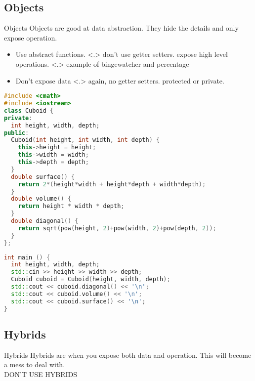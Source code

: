 \documentclass{beamer}
\begin{document}
\subsection{Objects}
\begin{frame}{Objects}
  Objects are good at data abstraction. They hide the details and only expose operation.
  \begin{itemize}[<+->]
    \item Use abstract functions. 
      \note[item]<.>{
        don't use getter setters. expose high level operations.
      }
      \note[item]<.>{
        example of bingewatcher and percentage
      }
    \item Don't expose data
      \note[item]<.>{
        again, no getter setters. protected or private.
      }
  \end{itemize}
\end{frame}
\begin{frame}[fragile]
  \begin{lstlisting}[language=C++]
#include <cmath>
#include <iostream>
class Cuboid {
private:
  int height, width, depth;
public:
  Cuboid(int height, int width, int depth) {
    this->height = height;
    this->width = width;
    this->depth = depth;
  }
  double surface() {
    return 2*(height*width + height*depth + width*depth);
  }
  double volume() {
    return height * width * depth;
  }
  double diagonal() {
    return sqrt(pow(height, 2)+pow(width, 2)+pow(depth, 2));
  }
};\end{lstlisting}
\end{frame}
\begin{frame}[fragile]
  \begin{lstlisting}[language=C++]
int main () {
  int height, width, depth;
  std::cin >> height >> width >> depth;
  Cuboid cuboid = Cuboid(height, width, depth);
  std::cout << cuboid.diagonal() << '\n';
  std::cout << cuboid.volume() << '\n';
  std::cout << cuboid.surface() << '\n';
} \end{lstlisting}
\end{frame}
\subsection{Hybrids}
\begin{frame}{Hybrids}
  Hybrids are when you expose both data and operation. This will become a mess to deal with.\\
  DON'T USE HYBRIDS
\end{frame}
\end{document}
